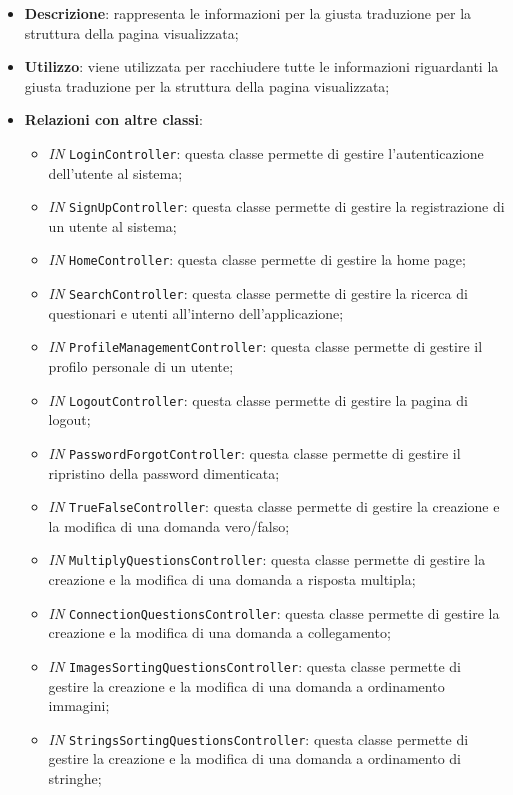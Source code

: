 		\begin{itemize}
			\item \textbf{Descrizione}: rappresenta le informazioni per la giusta traduzione per la struttura della pagina visualizzata;
			\item \textbf{Utilizzo}: viene utilizzata per racchiudere tutte le informazioni riguardanti la giusta traduzione per la struttura della pagina visualizzata;
			\item \textbf{Relazioni con altre classi}: 
			\begin{itemize}
				\item \textit{IN} \texttt{LoginController}: questa classe permette di gestire l'autenticazione dell'utente al sistema; 
				\item \textit{IN} \texttt{SignUpController}: questa classe permette di gestire la registrazione di un utente al sistema;
				\item \textit{IN} \texttt{HomeController}: questa classe permette di gestire la home page;
				\item \textit{IN} \texttt{SearchController}: questa classe permette di gestire la ricerca di questionari e utenti all'interno dell'applicazione;
				\item \textit{IN} \texttt{ProfileManagementController}: questa classe permette di gestire il profilo personale di un utente;
				\item \textit{IN} \texttt{LogoutController}: questa classe permette di gestire la pagina di logout;
				\item \textit{IN} \texttt{PasswordForgotController}: questa classe permette di gestire il ripristino della password dimenticata;
				\item \textit{IN} \texttt{TrueFalseController}: questa classe permette di gestire la creazione e la modifica di una domanda vero/falso;
				\item \textit{IN} \texttt{MultiplyQuestionsController}: questa classe permette di gestire la creazione e la modifica di una domanda a risposta multipla; 
				\item \textit{IN} \texttt{ConnectionQuestionsController}: questa classe permette di gestire la creazione e la modifica di una domanda a collegamento;
				\item \textit{IN} \texttt{ImagesSortingQuestionsController}: questa classe permette di gestire la creazione e la modifica di una domanda a ordinamento immagini;
				\item \textit{IN} \texttt{StringsSortingQuestionsController}: questa classe permette di gestire la creazione e la modifica di una domanda a ordinamento di stringhe;

\end{itemize}
\end{itemize}
